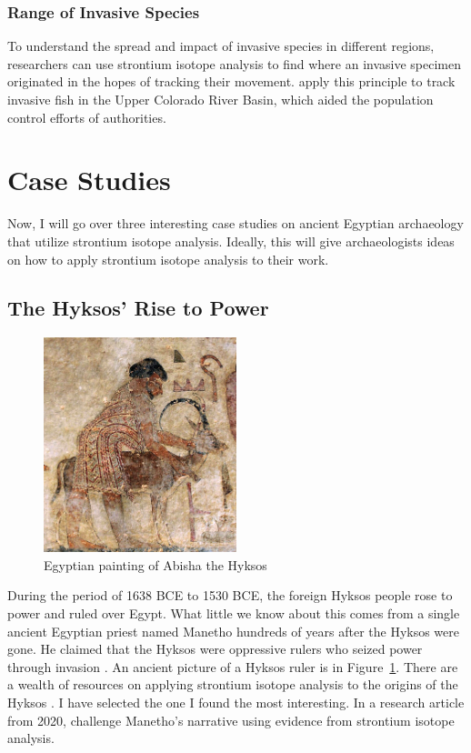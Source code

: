 \documentclass[a4paper, 12pt]{article}
\begin{document}
\subsubsection{Range of Invasive Species}
To understand the spread and impact of invasive species in different regions,
researchers can use strontium isotope analysis to find where an invasive
specimen originated in the hopes of tracking their movement. \cite{wolff2012} apply this principle
to track invasive fish in the Upper Colorado River Basin, which aided the population
control efforts of authorities.

\section{Case Studies}
Now, I will go over three interesting case studies on ancient Egyptian archaeology
that utilize strontium isotope analysis. Ideally, this will give archaeologists ideas on how to apply strontium isotope analysis to
their work.
\subsection{The Hyksos' Rise to Power}

\begin{figure}[htbp]
    \centering
    \includegraphics[width=0.5\textwidth]{hyksos_painting.jpg}
    \caption{Egyptian painting of Abisha the Hyksos \citep{wikipediaHyksos}}
    \label{fig:hyksos_painting}
\end{figure}
During the period of 1638 BCE to 1530 BCE, the foreign Hyksos people rose to power
and ruled over Egypt. What little we know about this comes
from a single ancient Egyptian priest named Manetho hundreds of years after the Hyksos were gone. He
claimed that the Hyksos were oppressive rulers who seized power through invasion \citep{stantis2020}.
An ancient picture of a Hyksos ruler is in Figure~\ref{fig:hyksos_painting}. There are a wealth
of resources on applying strontium isotope analysis to the origins of the Hyksos \citep*{stantis2020, stantis2021, weinstein2021, maaranen2019}.
I have selected the one I found the most interesting. In a research article from 2020, \cite{stantis2020} challenge
Manetho's narrative
using evidence from strontium isotope analysis.
\end{document}

